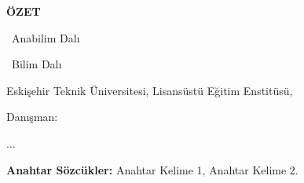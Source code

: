 \begin{center}
\textbf{ÖZET}\bigskip

\paramtitletr
\vspace{2\baselineskip}

\paramauthor \bigskip

\paramdepttr~Anabilim Dalı

\paramprogramtr~Bilim Dalı

Eskişehir Teknik Üniversitesi, Lisansüstü Eğitim Enstitüsü, \parammonthtr~\paramyear \bigskip

Danışman: \paramsupervisor
\end{center}
\vspace{\baselineskip}

\noindent ...
\vspace{\baselineskip}

\noindent \textbf{Anahtar Sözcükler:} Anahtar Kelime 1, Anahtar Kelime 2.

\newpage
